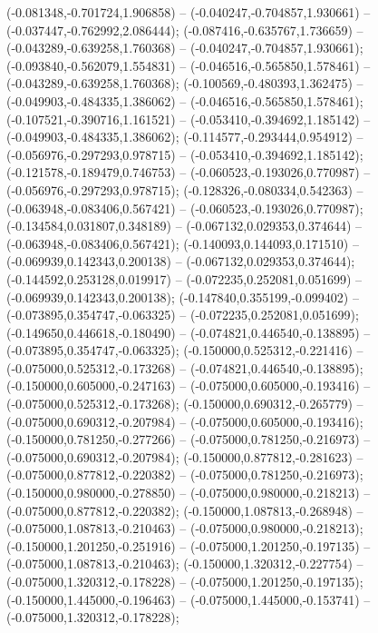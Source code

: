  (-0.081348,-0.701724,1.906858) -- (-0.040247,-0.704857,1.930661) -- (-0.037447,-0.762992,2.086444);
 (-0.087416,-0.635767,1.736659) -- (-0.043289,-0.639258,1.760368) -- (-0.040247,-0.704857,1.930661);
 (-0.093840,-0.562079,1.554831) -- (-0.046516,-0.565850,1.578461) -- (-0.043289,-0.639258,1.760368);
 (-0.100569,-0.480393,1.362475) -- (-0.049903,-0.484335,1.386062) -- (-0.046516,-0.565850,1.578461);
 (-0.107521,-0.390716,1.161521) -- (-0.053410,-0.394692,1.185142) -- (-0.049903,-0.484335,1.386062);
 (-0.114577,-0.293444,0.954912) -- (-0.056976,-0.297293,0.978715) -- (-0.053410,-0.394692,1.185142);
 (-0.121578,-0.189479,0.746753) -- (-0.060523,-0.193026,0.770987) -- (-0.056976,-0.297293,0.978715);
 (-0.128326,-0.080334,0.542363) -- (-0.063948,-0.083406,0.567421) -- (-0.060523,-0.193026,0.770987);
 (-0.134584,0.031807,0.348189) -- (-0.067132,0.029353,0.374644) -- (-0.063948,-0.083406,0.567421);
 (-0.140093,0.144093,0.171510) -- (-0.069939,0.142343,0.200138) -- (-0.067132,0.029353,0.374644);
 (-0.144592,0.253128,0.019917) -- (-0.072235,0.252081,0.051699) -- (-0.069939,0.142343,0.200138);
 (-0.147840,0.355199,-0.099402) -- (-0.073895,0.354747,-0.063325) -- (-0.072235,0.252081,0.051699);
 (-0.149650,0.446618,-0.180490) -- (-0.074821,0.446540,-0.138895) -- (-0.073895,0.354747,-0.063325);
 (-0.150000,0.525312,-0.221416) -- (-0.075000,0.525312,-0.173268) -- (-0.074821,0.446540,-0.138895);
 (-0.150000,0.605000,-0.247163) -- (-0.075000,0.605000,-0.193416) -- (-0.075000,0.525312,-0.173268);
 (-0.150000,0.690312,-0.265779) -- (-0.075000,0.690312,-0.207984) -- (-0.075000,0.605000,-0.193416);
 (-0.150000,0.781250,-0.277266) -- (-0.075000,0.781250,-0.216973) -- (-0.075000,0.690312,-0.207984);
 (-0.150000,0.877812,-0.281623) -- (-0.075000,0.877812,-0.220382) -- (-0.075000,0.781250,-0.216973);
 (-0.150000,0.980000,-0.278850) -- (-0.075000,0.980000,-0.218213) -- (-0.075000,0.877812,-0.220382);
 (-0.150000,1.087813,-0.268948) -- (-0.075000,1.087813,-0.210463) -- (-0.075000,0.980000,-0.218213);
 (-0.150000,1.201250,-0.251916) -- (-0.075000,1.201250,-0.197135) -- (-0.075000,1.087813,-0.210463);
 (-0.150000,1.320312,-0.227754) -- (-0.075000,1.320312,-0.178228) -- (-0.075000,1.201250,-0.197135);
 (-0.150000,1.445000,-0.196463) -- (-0.075000,1.445000,-0.153741) -- (-0.075000,1.320312,-0.178228);
